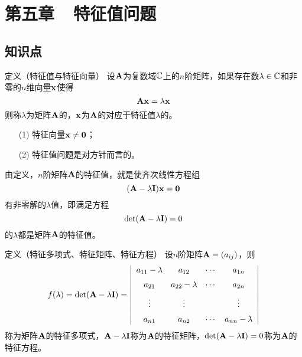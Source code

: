 \section{第五章~~特征值问题}

\subsection{知识点}


\begin{frame}
  \begin{footnotesize}
    \begin{block}{定义（特征值与特征向量）}
      设$\mathbf{A}$为复数域$\mathbb{C}$上的$n$阶矩阵，如果存在数$\lambda\in\mathbb{C}$和非零的$n$维向量$\mathbf{x}$使得
      $$
      \mathbf{A}\mathbf{x}=\lambda\mathbf{x}
      $$
      则称$\lambda$为矩阵$\mathbf{A}$的，$\mathbf{x}$为$\mathbf{A}$的对应于特征值$\lambda$的。
    \end{block}  

    \begin{itemize}
    \item[(1)] 特征向量$\mathbf{x}\ne\mathbf{0}$；
    \item[(2)] 特征值问题是对方针而言的。 
    \end{itemize}
  \end{footnotesize}
\end{frame}


\begin{frame}
  \begin{footnotesize}
    由定义，$n$阶矩阵$\mathbf{A}$的特征值，就是使齐次线性方程组
    $$
    (\mathbf{A}-\lambda\mathbf{I})\mathbf{x}=\mathbf{0}
    $$
    有非零解的$\lambda$值，即满足方程
    $$
    \det(\mathbf{A}-\lambda\mathbf{I})=0
    $$
    的$\lambda$都是矩阵$\mathbf{A}$的特征值。
    \pause


    
  \end{footnotesize}
\end{frame}


\begin{frame}
  \begin{footnotesize}
    \begin{block}{定义（特征多项式、特征矩阵、特征方程）}
      设$n$阶矩阵$\mathbf{A}=(a_{ij})$，则
      $$
      f(\lambda)=\det(\mathbf{A}-\lambda\mathbf{I})
      =\left|
      \begin{array}{cccc}
       a_{11}- \lambda&a_{12}&\cdots&a_{1n}\\[0.2cm]
        a_{21}&a_{22}-\lambda&\cdots&a_{2n}\\[0.2cm]
        \vdots&\vdots&&\vdots\\[0.2cm]
        a_{n1}&a_{n2}&\cdots&a_{nn}-\lambda
      \end{array}
      \right|
      $$
      称为矩阵$\mathbf{A}$的特征多项式，$\mathbf{A}-\lambda\mathbf{I}$称为$\mathbf{A}$的特征矩阵，$\det(\mathbf{A}-\lambda\mathbf{I})=0$称为$\mathbf{A}$的特征方程。
    \end{block}
    
  \end{footnotesize}
\end{frame}

